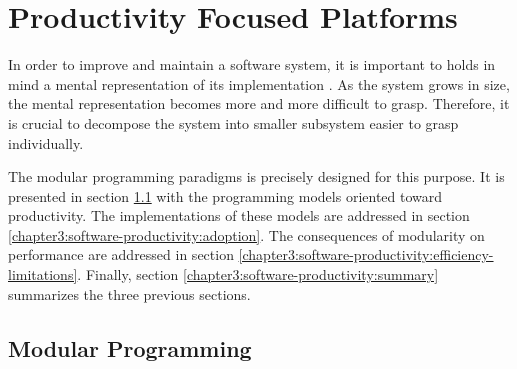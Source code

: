 \section{Productivity Focused Platforms} \label{chapter3:software-productivity}


In order to improve and maintain a software system, it is important to holds in mind a mental representation of its implementation \cite{Simon1962}.
As the system grows in size, the mental representation becomes more and more difficult to grasp.
Therefore, it is crucial to decompose the system into smaller subsystem easier to grasp individually.


The modular programming paradigms is precisely designed for this purpose.
It is presented in section \ref{chapter3:software-productivity:modularity} with the programming models oriented toward productivity.
The implementations of these models are addressed in section \ref{chapter3:software-productivity:adoption}.
The consequences of modularity on performance are addressed in section \ref{chapter3:software-productivity:efficiency-limitations}.
Finally, section \ref{chapter3:software-productivity:summary} summarizes the three previous sections.

\subsection{Modular Programming} \label{chapter3:software-productivity:modularity}

\begin{figure}[h!]
%
\end{figure}

